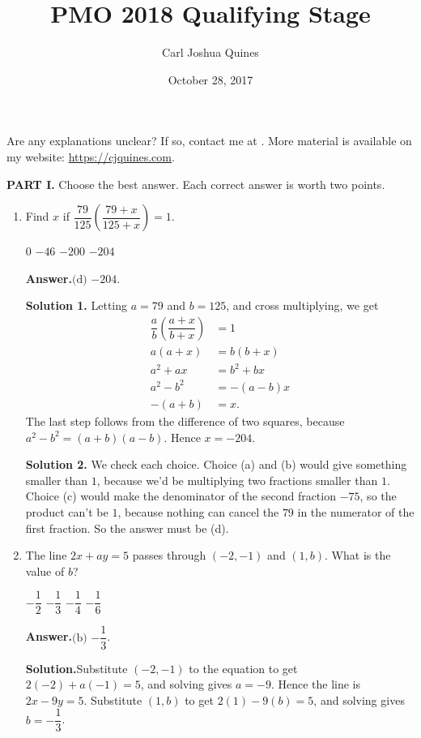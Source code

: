 \documentclass[11pt,paper=letter]{scrartcl}
\newcommand{\ans}{{\sffamily \bfseries Answer.}\;}
\newcommand{\ansb}[2]{\ans\(\boxed{\text{(#1) #2}}\).}
\newcommand{\sol}{{\sffamily \bfseries Solution.}\;}
\newcommand{\soln}[1]{{\sffamily \bfseries Solution #1.}\;}
\begin{document}
\title{PMO 2018 Qualifying Stage}
\author{Carl Joshua Quines}
\date{October 28, 2017}

\maketitle

Are any explanations unclear? If so, contact me at . More material is available on my website: \url{https://cjquines.com}.

\textbf{PART I.} Choose the best answer. Each correct answer is worth two points.

\begin{enumerate}[left=0pt]

\item Find $x$ if $\dfrac{79}{125}\left(\dfrac{79+x}{125+x}\right) = 1$.

\fourch
{$0$}
{$-46$}
{$-200$}
{$-204$}

\ansb{d}{$-204$}

\soln1 Letting $a = 79$ and $b = 125$, and cross multiplying, we get
\begin{align*}
\dfrac{a}{b}\left(\dfrac{a+x}{b+x}\right) &= 1 \\
a(a+x) &= b(b+x) \\
a^2 + ax &= b^2 + bx \\
a^2 - b^2 &= -(a - b)x \\
-(a + b) &= x.
\end{align*}
The last step follows from the difference of two squares, because $a^2 - b^2 = (a + b)(a - b)$. Hence $x = -204$.

\soln2 We check each choice. Choice (a) and (b) would give something smaller than $1$, because we'd be multiplying two fractions smaller than $1$. Choice (c) would make the denominator of the second fraction $-75$, so the product can't be $1$, because nothing can cancel the $79$ in the numerator of the first fraction. So the answer must be (d).

\item The line $2x + ay = 5$ passes through $(-2, -1)$ and $(1, b)$. What is the value of $b$?

\fourch
{$-\dfrac{1}{2}$}
{$-\dfrac{1}{3}$}
{$-\dfrac{1}{4}$}
{$-\dfrac{1}{6}$}

\ansb{b}{$-\dfrac{1}{3}$}

\sol Substitute $(-2, -1)$ to the equation to get $2(-2) + a(-1) = 5$, and solving gives $a = -9$. Hence the line is $2x - 9y = 5$. Substitute $(1, b)$ to get $2(1) - 9(b) = 5$, and solving gives $b = -\dfrac{1}{3}$.


\end{enumerate}
\end{document}
